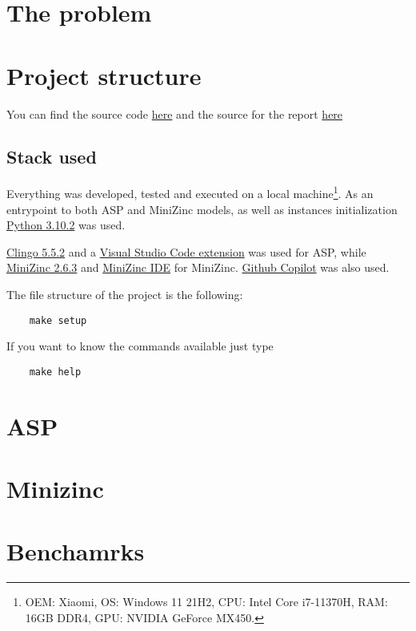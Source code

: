 \section{The problem}

\section{Project structure}
You can find the source code \href{https://github.com/pinzauti/automated-reasoning}{here} and the source for the report \href{https://github.com/pinzauti/automated-reasoning-report}{here}

\subsection{Stack used}

Everything was developed, tested and executed on a local machine\footnote{OEM: Xiaomi, OS: Windows 11 21H2, CPU: Intel Core i7-11370H, RAM: 16GB DDR4, GPU: NVIDIA GeForce MX450.}. As an entrypoint to both ASP and MiniZinc models, as well as instances initialization \href{https://www.python.org/downloads/release/python-3102/}{Python 3.10.2} was used.

\href{https://github.com/potassco/clingo/releases/tag/v5.5.2}{Clingo 5.5.2} and a \href{https://marketplace.visualstudio.com/items?itemName=abelcour.asp-syntax-highlight}{Visual Studio Code extension} was used for ASP, while \href{https://github.com/MiniZinc/libminizinc/releases/tag/2.6.3}{MiniZinc 2.6.3} and \href{https://www.minizinc.org/ide/}{MiniZinc IDE} for MiniZinc. \href{https://copilot.github.com/}{Github Copilot} was also used.

The file structure of the project is the following:

\begin{verbatim}
    make setup
\end{verbatim}

If you want to know the commands available just type

\begin{verbatim}
    make help 
\end{verbatim}
\section{ASP}

\section{Minizinc}

\section{Benchamrks}